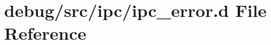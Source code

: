 \hypertarget{ipc__error_8d}{
\section{debug/src/ipc/ipc\_\-error.d File Reference}
\label{ipc__error_8d}
}

